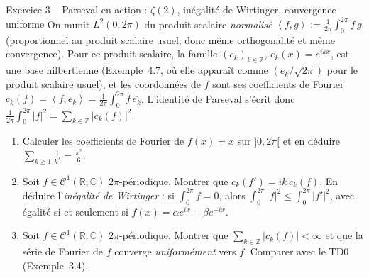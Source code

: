 \documentclass[11pt,a4paper]{article}
\newcommand{\R}{\mathbb{R}}
\newcommand{\Z}{\mathbb{Z}}
\newcommand{\C}{\mathbb{C}}
\newcommand{\ps}[2]{\left\langle #1,#2\right\rangle}
\theoremstyle{definition}
\begin{document}
\begin{exo}{Exercice 3 -- Parseval en action : $\zeta(2)$, inégalité de Wirtinger, convergence uniforme}
On munit $L^2(0,2\pi)$ du produit scalaire \emph{normalisé} $\ps fg:=\frac1{2\pi}\int_0^{2\pi}f\,\overline g$ (proportionnel au produit scalaire usuel, donc même orthogonalité et même convergence). Pour ce produit scalaire, la famille $(e_k)_{k\in\Z}$, $e_k(x)=e^{ikx}$, est une base hilbertienne (Exemple~4.7, où elle apparaît comme $(e_k/\sqrt{2\pi})$ pour le produit scalaire usuel), et les coordonnées de $f$ sont ses coefficients de Fourier $c_k(f)=\ps f{e_k}=\frac1{2\pi}\int_0^{2\pi}f\,\overline{e_k}$. L'identité de Parseval s'écrit donc $\frac1{2\pi}\int_0^{2\pi}|f|^2=\sum_{k\in\Z}|c_k(f)|^2$.
\begin{enumerate}[label=(\alph*)]
  \item Calculer les coefficients de Fourier de $f(x)=x$ sur $]0,2\pi[$ et en déduire $\sum_{k\ge1}\frac1{k^2}=\frac{\pi^2}6$.
  \item Soit $f\in\mathcal C^1(\R;\C)$ $2\pi$-périodique. Montrer que $c_k(f')=ik\,c_k(f)$. En déduire l'\emph{inégalité de Wirtinger} : si $\int_0^{2\pi}f=0$, alors $\int_0^{2\pi}|f|^2\le\int_0^{2\pi}|f'|^2$, avec égalité si et seulement si $f(x)=\alpha e^{ix}+\beta e^{-ix}$.
  \item Soit $f\in\mathcal C^1(\R;\C)$ $2\pi$-périodique. Montrer que $\sum_{k\in\Z}|c_k(f)|<\infty$ et que la série de Fourier de $f$ converge \emph{uniformément} vers $f$. Comparer avec le TD0 (Exemple~3.4).
\end{enumerate}
\end{exo}
\end{document}
